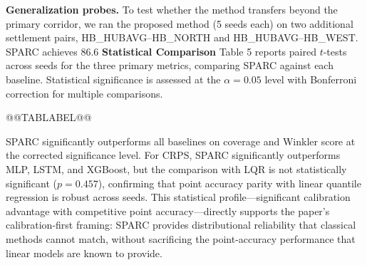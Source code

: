 {\textbf{Generalization probes.} To test whether the method transfers beyond the primary corridor, we ran the proposed method (5 seeds each) on two additional settlement pairs, HB_HUBAVG--HB_NORTH and HB_HUBAVG--HB_WEST. SPARC achieves 86.6%
\textbf{Statistical Comparison}
Table 5 reports paired $t$-tests across seeds for the three primary metrics, comparing SPARC against each baseline. Statistical significance is assessed at the $\alpha = 0.05$ level with Bonferroni correction for multiple comparisons.
\begin{table}[t]
\caption{}
@@TABLABEL@@
\centering
{}
\end{table}
SPARC significantly outperforms all baselines on coverage and Winkler score at the corrected significance level. For CRPS, SPARC significantly outperforms MLP, LSTM, and XGBoost, but the comparison with LQR is not statistically significant ($p = 0.457$), confirming that point accuracy parity with linear quantile regression is robust across seeds. This statistical profile---significant calibration advantage with competitive point accuracy---directly supports the paper's calibration-first framing: SPARC provides distributional reliability that classical methods cannot match, without sacrificing the point-accuracy performance that linear models are known to provide.
}
